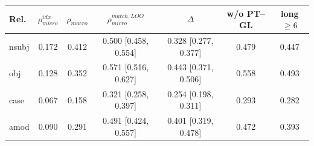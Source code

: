 \begin{tabular}{lcccccc}
\toprule
Rel. & $\rho^{idx}_{micro}$ & $\rho_{macro}$ & $\rho^{match,LOO}_{micro}$ & $\Delta$ & w/o PT--GL & long $\geq 6$ \\
\midrule
nsubj & 0.172 & 0.412 & 0.500 [0.458, 0.554] & 0.328 [0.277, 0.377] & 0.479 & 0.447 \\
obj & 0.128 & 0.352 & 0.571 [0.516, 0.627] & 0.443 [0.371, 0.506] & 0.558 & 0.493 \\
case & 0.067 & 0.158 & 0.321 [0.258, 0.397] & 0.254 [0.198, 0.311] & 0.293 & 0.282 \\
amod & 0.090 & 0.291 & 0.491 [0.424, 0.557] & 0.401 [0.319, 0.478] & 0.472 & 0.393 \\
\bottomrule
\end{tabular}
